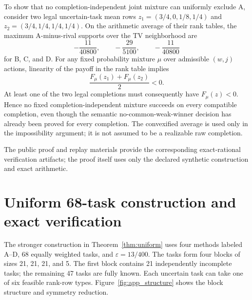 \documentclass[preprint,11pt]{elsarticle}
\begin{document}
To show that no completion-independent joint mixture can uniformly exclude A, consider two legal uncertain-task mean rows $z_1=(3/4,0,1/8,1/4)$ and $z_2=(3/4,1/4,1/4,1/4)$. On the arithmetic average of their rank tables, the maximum A-minus-rival supports over the TV neighborhood are
\begin{equation}\label{eq:app_convex_supports}
-\frac{11}{40800},\qquad -\frac{29}{5100},\qquad -\frac{11}{40800}
\end{equation}
for B, C, and D. For any fixed probability mixture $\mu$ over admissible $(w,j)$ actions, linearity of the payoff in the rank table implies
\begin{equation}\label{eq:app_mixture}
\frac{F_\mu(z_1)+F_\mu(z_2)}2<0.
\end{equation}
At least one of the two legal completions must consequently have $F_\mu(z)<0$. Hence no fixed completion-independent mixture succeeds on every compatible completion, even though the semantic no-common-weak-winner decision has already been proved for every completion. The convexified average is used only in the impossibility argument; it is not assumed to be a realizable raw completion.

The public proof and replay materials provide the corresponding exact-rational verification artifacts; the proof itself uses only the declared synthetic construction and exact arithmetic.

\section{Uniform 68-task construction and exact verification}\label{app:uniform}
The stronger construction in Theorem~\ref{thm:uniform} uses four methods labeled A--D, 68 equally weighted tasks, and $\varepsilon=13/400$. The tasks form four blocks of sizes 21, 21, 21, and 5. The first block contains 21 independently incomplete tasks; the remaining 47 tasks are fully known. Each uncertain task can take one of six feasible rank-row types. Figure~\ref{fig:app_structure} shows the block structure and symmetry reduction.
\end{document}
